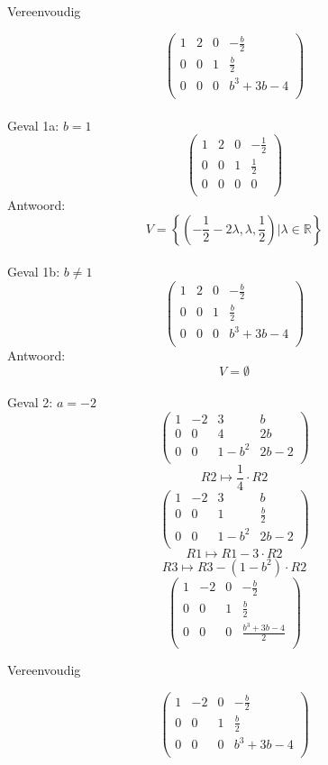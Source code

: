 \documentclass[lineaire_algebra_oplossingen.tex]{subfiles}
\begin{document}
\begin{center}
Vereenvoudig
\end{center}
\[
\begin{pmatrix}
1 & 2 & 0 & -\frac{b}{2}\\
0 & 0 & 1 & \frac{b}{2}\\
0 & 0 & 0 & b^{3}+3b-4\\
\end{pmatrix}
\]
\\Geval 1a: $b=1$
\[
\begin{pmatrix}
1 & 2 & 0 & -\frac{1}{2}\\
0 & 0 & 1 & \frac{1}{2}\\
0 & 0 & 0 & 0\\
\end{pmatrix}
\]
Antwoord:
\[
V = \left\lbrace \left(-\frac{1}{2}-2\lambda,\lambda,\frac{1}{2}\right)| \lambda \in \mathbb{R}\right\rbrace
\]
\\Geval 1b: $b\neq 1$
\[
\begin{pmatrix}
1 & 2 & 0 & -\frac{b}{2}\\
0 & 0 & 1 & \frac{b}{2}\\
0 & 0 & 0 & b^{3}+3b-4\\
\end{pmatrix}
\]
Antwoord:
\[
V = \emptyset
\]
\\Geval 2: $a=-2$
\[
\begin{pmatrix}
1 & -2 & 3 & b\\
0 & 0 & 4 & 2b\\
0 & 0 & 1-b^{2} & 2b-2\\
\end{pmatrix}
\]
\[ R2 \longmapsto \frac{1}{4}\cdot R2 \]
\[
\begin{pmatrix}
1 & -2 & 3 & b\\
0 & 0 & 1 & \frac{b}{2}\\
0 & 0 & 1-b^{2} & 2b-2\\
\end{pmatrix}
\]
\[ R1 \longmapsto R1 - 3\cdot R2 \]
\[ R3 \longmapsto R3 - (1-b^{2})\cdot R2 \]
\[
\begin{pmatrix}
1 & -2 & 0 & -\frac{b}{2}\\
0 & 0 & 1 & \frac{b}{2}\\
0 & 0 & 0 & \frac{b^3+3b-4}{2}\\
\end{pmatrix}
\]
\begin{center}
Vereenvoudig
\end{center}
\[
\begin{pmatrix}
1 & -2 & 0 & -\frac{b}{2}\\
0 & 0 & 1 & \frac{b}{2}\\
0 & 0 & 0 & b^3+3b-4\\
\end{pmatrix}
\]
\end{document}

